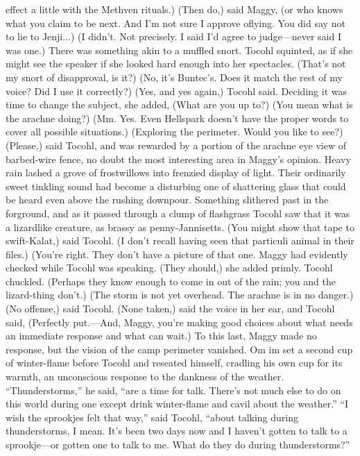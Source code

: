 \documentclass[9pt]{article}
\begin{document}
effect a little with the Methven rituals.)
(Then do,) said Maggy, (or who knows what you claim to be next. And I’m not sure I approve oflying. You did say not to lie to Jenji...)
(I didn’t. Not precisely. I said I’d agree to judge—never said I was one.)
There was something akin to a muffled snort. Tocohl squinted, as if she might see the speaker if she
looked hard enough into her spectacles. (That’s not my snort of disapproval, is it?)
(No, it’s Buntec’s. Does it match the rest of my voice? Did I use it correctly?)
(Yes, and yes again,) Tocohl said. Deciding it was time to change the subject, she added, (What are
you up to?)
(You mean what is the arachne doing?)
(Mm. Yes. Even Hellspark doesn’t have the proper words to cover all possible situations.)
(Exploring the perimeter. Would you like to see?)
(Please,) said Tocohl, and was rewarded by a portion of the arachne eye view of barbed-wire fence,
no doubt the most interesting area in Maggy’s opinion.
Heavy rain lashed a grove of frostwillows into frenzied display of light. Their ordinarily sweet tinkling
sound had become a disturbing one of shattering glass that could be heard even above the rushing
downpour. Something slithered past in the forground, and as it passed through a clump of flashgrass
Tocohl saw that it was a lizardlike creature, as brassy as penny-Jannisetts.
(You might show that tape to swift-Kalat,) said Tocohl. (I don’t recall having seen that particuli
animal in their files.)
(You’re right. They don’t have a picture of that one. Maggy had evidently checked while Tocohl was
speaking. (They should,) she added primly.
Tocohl chuckled. (Perhaps they know enough to come in out of the rain; you and the lizard-thing
don’t.)
(The storm is not yet overhead. The arachne is in no danger.)
(No offense,) said Tocohl.
(None taken,) said the voice in her ear, and Tocohl said, (Perfectly put.—And, Maggy, you’re
making good choices about what needs an immediate response and what can wait.)
To this last, Maggy made no response, but the vision of the camp perimeter vanished. Om im set a
second cup of winter-flame before Tocohl and reseated himself, cradling his own cup for its warmth, an
unconscious response to the dankness of the weather.
“Thunderstorms,” he said, “are a time for talk. There’s not much else to do on this world during one
except drink winter-flame and cavil about the weather.”
“I wish the sprookjes felt that way,” said Tocohl, “about talking during thunderstorms, I mean. It’s
been two days now and I haven’t gotten to talk to a sprookje—or gotten one to talk to me. What do
they do during thunderstorms?”
\end{document}
